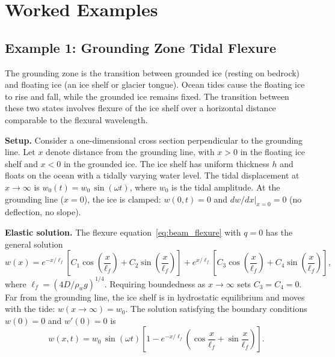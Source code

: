 \documentclass[11pt]{article}
\begin{document}
\section{Worked Examples}
\label{sec:worked_examples}

\subsection{Example 1: Grounding Zone Tidal Flexure}
\label{sec:example_grounding}

The grounding zone is the transition between grounded ice (resting on bedrock) and floating ice (an ice shelf or glacier tongue).  Ocean tides cause the floating ice to rise and fall, while the grounded ice remains fixed.  The transition between these two states involves flexure of the ice shelf over a horizontal distance comparable to the flexural wavelength.

\medskip
\noindent\textbf{Setup.}  Consider a one-dimensional cross section perpendicular to the grounding line.  Let $x$ denote distance from the grounding line, with $x > 0$ in the floating ice shelf and $x < 0$ in the grounded ice.  The ice shelf has uniform thickness $h$ and floats on the ocean with a tidally varying water level.  The tidal displacement at $x \to \infty$ is $w_0(t) = w_0\,\sin(\omega t)$, where $w_0$ is the tidal amplitude.  At the grounding line ($x = 0$), the ice is clamped: $w(0,t) = 0$ and $dw/dx|_{x=0} = 0$ (no deflection, no slope).

\medskip
\noindent\textbf{Elastic solution.}  The flexure equation~\eqref{eq:beam_flexure} with $q = 0$ has the general solution
\begin{equation}
  w(x) = e^{-x/\ell_f}\!\left[C_1\cos\!\left(\frac{x}{\ell_f}\right) + C_2\sin\!\left(\frac{x}{\ell_f}\right)\right] + e^{x/\ell_f}\!\left[C_3\cos\!\left(\frac{x}{\ell_f}\right) + C_4\sin\!\left(\frac{x}{\ell_f}\right)\right],
  \label{eq:flexure_general}
\end{equation}
where $\ell_f = (4D/\rho_w g)^{1/4}$.  Requiring boundedness as $x \to \infty$ sets $C_3 = C_4 = 0$.  Far from the grounding line, the ice shelf is in hydrostatic equilibrium and moves with the tide: $w(x \to \infty) = w_0$.  The solution satisfying the boundary conditions $w(0) = 0$ and $w'(0) = 0$ is
\begin{equation}
  \boxed{w(x,t) = w_0\,\sin(\omega t)\left[1 - e^{-x/\ell_f}\!\left(\cos\frac{x}{\ell_f} + \sin\frac{x}{\ell_f}\right)\right].}
  \label{eq:tidal_flexure}
\end{equation}
\end{document}
